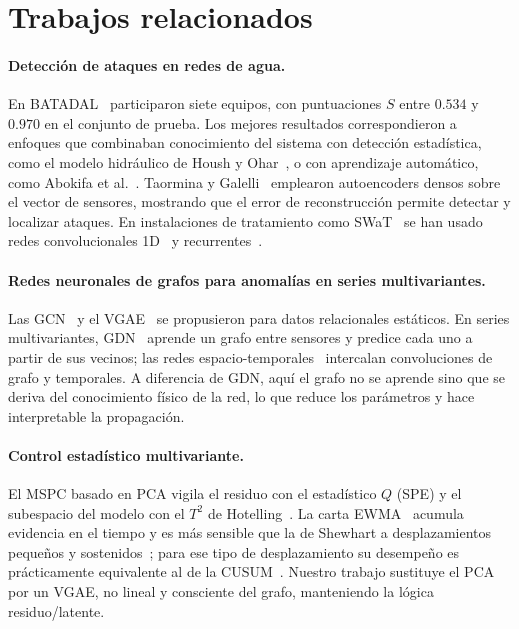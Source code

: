\documentclass[11pt,a4paper]{article}
\begin{document}
\section{Trabajos relacionados}

\paragraph{Detección de ataques en redes de agua.}
En BATADAL~\cite{taormina2018} participaron siete equipos, con puntuaciones $S$ entre
$0.534$ y $0.970$ en el conjunto de prueba. Los mejores resultados correspondieron a
enfoques que combinaban conocimiento del sistema con detección estadística, como el
modelo hidráulico de Housh y Ohar~\cite{housh2018}, o con aprendizaje automático, como
Abokifa et al.~\cite{abokifa2019}. Taormina y Galelli~\cite{taormina2018deep}
emplearon autoencoders densos sobre el vector de sensores, mostrando que el error de
reconstrucción permite detectar y localizar ataques. En instalaciones de tratamiento
como SWaT~\cite{goh2016} se han usado redes convolucionales 1D~\cite{kravchik2018} y
recurrentes~\cite{hundman2018}.

\paragraph{Redes neuronales de grafos para anomalías en series multivariantes.}
Las GCN~\cite{kipf2017} y el VGAE~\cite{kipf2016} se propusieron para datos
relacionales estáticos. En series multivariantes, GDN~\cite{deng2021} aprende un
grafo entre sensores y predice cada uno a partir de sus vecinos; las redes
espacio-temporales~\cite{yu2018} intercalan convoluciones de grafo y temporales. A
diferencia de GDN, aquí el grafo no se aprende sino que se deriva del conocimiento
físico de la red, lo que reduce los parámetros y hace interpretable la propagación.

\paragraph{Control estadístico multivariante.}
El MSPC basado en PCA vigila el residuo con el estadístico $Q$ (SPE) y el subespacio
del modelo con el $T^2$ de Hotelling~\cite{jackson1979,kourti1995,nomikos1995}. La
carta EWMA~\cite{roberts1959} acumula evidencia en el tiempo y es más sensible que la
de Shewhart a desplazamientos pequeños y sostenidos~\cite{montgomery2019}; para ese
tipo de desplazamiento su desempeño es prácticamente equivalente al de la
CUSUM~\cite{page1954,lucas1990}. Nuestro trabajo sustituye el PCA por un VGAE, no lineal
y consciente del grafo, manteniendo la lógica residuo/latente.
\end{document}
